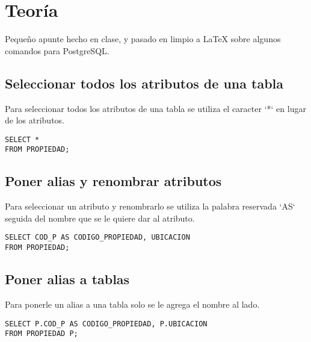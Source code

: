 \documentclass{templateNote}
\begin{document}
\portada %
\margenes %


\section{Teoría}
\indent
Pequeño apunte hecho en clase, y pasado en limpio a LaTeX sobre algunos comandos para PostgreSQL.

\subsection{Seleccionar todos los atributos de una tabla}
\indent
Para seleccionar todos los atributos de una tabla se utiliza el caracter `*` en lugar de los atributos.
\begin{tcolorbox}
    [colback=gray!5!white,colframe=gray!75!black,fonttitle=\bfseries,title=SQL]
    \begin{sqlcode}
    \end{sqlcode}
    \begin{verbatim}
SELECT *
FROM PROPIEDAD;
    \end{verbatim}
\end{tcolorbox}


\subsection{Poner alias y renombrar atributos}
\indent
Para seleccionar un atributo y renombrarlo se utiliza la palabra reservada `AS` seguida del nombre que se le quiere dar al atributo.
\begin{tcolorbox}
    [colback=gray!5!white,colframe=gray!75!black,fonttitle=\bfseries,title=SQL]
    \begin{sqlcode}
    \end{sqlcode}
    \begin{verbatim}
SELECT COD_P AS CODIGO_PROPIEDAD, UBICACION
FROM PROPIEDAD;
    \end{verbatim}
\end{tcolorbox}

\newpage
\subsection{Poner alias a tablas}
\indent
Para ponerle un alias a una tabla solo se le agrega el nombre al lado.
\begin{tcolorbox}
    [colback=gray!5!white,colframe=gray!75!black,fonttitle=\bfseries,title=SQL]
    \begin{sqlcode}
    \end{sqlcode}
    \begin{verbatim}
SELECT P.COD_P AS CODIGO_PROPIEDAD, P.UBICACION
FROM PROPIEDAD P;
    \end{verbatim}
\end{tcolorbox}
\end{document}
